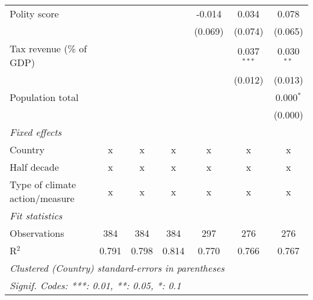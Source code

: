 \begin{tabular}{lcccccc}
   Polity score                                                          &         &               &                & -0.014         & 0.034          & 0.078\\   
                                                                         &         &               &                & (0.069)        & (0.074)        & (0.065)\\   
   Tax revenue (\% of GDP)                                               &         &               &                &                & 0.037$^{***}$  & 0.030$^{**}$\\   
                                                                         &         &               &                &                & (0.012)        & (0.013)\\   
   Population total                                                      &         &               &                &                &                & 0.000$^{*}$\\   
                                                                         &         &               &                &                &                & (0.000)\\   
   \emph{Fixed effects}\\
   Country                                                               & x       & x             & x              & x              & x              & x\\  
   Half decade                                                           & x       & x             & x              & x              & x              & x\\  
   Type of climate action/measure                                        & x       & x             & x              & x              & x              & x\\  
   \midrule \emph{Fit statistics}\\
   Observations                                                          & 384     & 384           & 384            & 297            & 276            & 276\\  
   R$^2$                                                                 & 0.791   & 0.798         & 0.814          & 0.770          & 0.766          & 0.767\\  
   \midrule
   \multicolumn{7}{l}{\emph{Clustered (Country) standard-errors in parentheses}}\\
   \multicolumn{7}{l}{\emph{Signif. Codes: ***: 0.01, **: 0.05, *: 0.1}}\\
\end{tabular}
\par\endgroup


